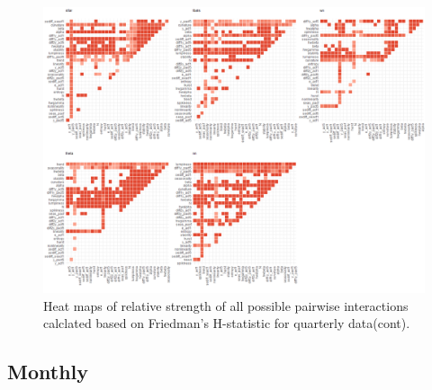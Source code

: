 \documentclass[11pt,a4paper,]{article}
\theoremstyle{definition}
\theoremstyle{definition}
\theoremstyle{definition}
\theoremstyle{remark}
\begin{document}
\begin{figure}
\centering
\includegraphics{figures/friedmanQ2-1.png}
\caption{\label{fig:friedmanQ2}Heat maps of relative strength of all
possible pairwise interactions calclated based on Friedman's H-statistic
for quarterly data(cont).}
\end{figure}

\newpage

\subsection{Monthly}\label{monthly}
\end{document}
